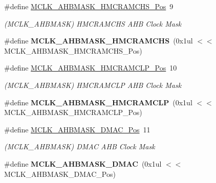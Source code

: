 \begin{DoxyCompactItemize}
\item 
\hypertarget{group___s_a_m_l21___m_c_l_k_ga9de749365f52d084fd08c0aaa9fcb467}{}\#define \hyperlink{group___s_a_m_l21___m_c_l_k_ga9de749365f52d084fd08c0aaa9fcb467}{M\+C\+L\+K\+\_\+\+A\+H\+B\+M\+A\+S\+K\+\_\+\+H\+M\+C\+R\+A\+M\+C\+H\+S\+\_\+\+Pos}~9\label{group___s_a_m_l21___m_c_l_k_ga9de749365f52d084fd08c0aaa9fcb467}

\begin{DoxyCompactList}\small\item\em (M\+C\+L\+K\+\_\+\+A\+H\+B\+M\+A\+S\+K) H\+M\+C\+R\+A\+M\+C\+H\+S A\+H\+B Clock Mask \end{DoxyCompactList}\item 
\hypertarget{group___s_a_m_l21___m_c_l_k_ga52a0ac082cc2b3571d54c78a16df5972}{}\#define {\bfseries M\+C\+L\+K\+\_\+\+A\+H\+B\+M\+A\+S\+K\+\_\+\+H\+M\+C\+R\+A\+M\+C\+H\+S}~(0x1ul $<$$<$ M\+C\+L\+K\+\_\+\+A\+H\+B\+M\+A\+S\+K\+\_\+\+H\+M\+C\+R\+A\+M\+C\+H\+S\+\_\+\+Pos)\label{group___s_a_m_l21___m_c_l_k_ga52a0ac082cc2b3571d54c78a16df5972}

\item 
\hypertarget{group___s_a_m_l21___m_c_l_k_ga8c2786acd24ae163abbe7b6db31524ca}{}\#define \hyperlink{group___s_a_m_l21___m_c_l_k_ga8c2786acd24ae163abbe7b6db31524ca}{M\+C\+L\+K\+\_\+\+A\+H\+B\+M\+A\+S\+K\+\_\+\+H\+M\+C\+R\+A\+M\+C\+L\+P\+\_\+\+Pos}~10\label{group___s_a_m_l21___m_c_l_k_ga8c2786acd24ae163abbe7b6db31524ca}

\begin{DoxyCompactList}\small\item\em (M\+C\+L\+K\+\_\+\+A\+H\+B\+M\+A\+S\+K) H\+M\+C\+R\+A\+M\+C\+L\+P A\+H\+B Clock Mask \end{DoxyCompactList}\item 
\hypertarget{group___s_a_m_l21___m_c_l_k_ga6996ee47d34b0119f0de51f638bb8ba5}{}\#define {\bfseries M\+C\+L\+K\+\_\+\+A\+H\+B\+M\+A\+S\+K\+\_\+\+H\+M\+C\+R\+A\+M\+C\+L\+P}~(0x1ul $<$$<$ M\+C\+L\+K\+\_\+\+A\+H\+B\+M\+A\+S\+K\+\_\+\+H\+M\+C\+R\+A\+M\+C\+L\+P\+\_\+\+Pos)\label{group___s_a_m_l21___m_c_l_k_ga6996ee47d34b0119f0de51f638bb8ba5}

\item 
\hypertarget{group___s_a_m_l21___m_c_l_k_ga9777b9f4e5c6f15597d5d0f3c284a638}{}\#define \hyperlink{group___s_a_m_l21___m_c_l_k_ga9777b9f4e5c6f15597d5d0f3c284a638}{M\+C\+L\+K\+\_\+\+A\+H\+B\+M\+A\+S\+K\+\_\+\+D\+M\+A\+C\+\_\+\+Pos}~11\label{group___s_a_m_l21___m_c_l_k_ga9777b9f4e5c6f15597d5d0f3c284a638}

\begin{DoxyCompactList}\small\item\em (M\+C\+L\+K\+\_\+\+A\+H\+B\+M\+A\+S\+K) D\+M\+A\+C A\+H\+B Clock Mask \end{DoxyCompactList}\item 
\hypertarget{group___s_a_m_l21___m_c_l_k_ga528ff2fc41ed495daa5426a00d005543}{}\#define {\bfseries M\+C\+L\+K\+\_\+\+A\+H\+B\+M\+A\+S\+K\+\_\+\+D\+M\+A\+C}~(0x1ul $<$$<$ M\+C\+L\+K\+\_\+\+A\+H\+B\+M\+A\+S\+K\+\_\+\+D\+M\+A\+C\+\_\+\+Pos)\label{group___s_a_m_l21___m_c_l_k_ga528ff2fc41ed495daa5426a00d005543}


\end{DoxyCompactItemize}
